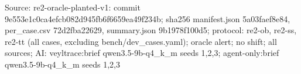 \begin{table}[t]
Source: re2-oracle-planted-v1: commit 9e553e1c0ca4efcb082d945fb6f6659ea49f234b; sha256 manifest.json 5a03faef8e84, per\_case.csv 72d2fba22629, summary.json 9b1978f100d5; protocol: re2-ob, re2-ss, re2-tt (all cases, excluding bench/dev\_cases.yaml); oracle alert; no shift; all sources; AI: veyltrace:brief qwen3.5-9b-q4\_k\_m seeds 1,2,3; agent-only:brief qwen3.5-9b-q4\_k\_m seeds 1,2,3\\
\end{table}
